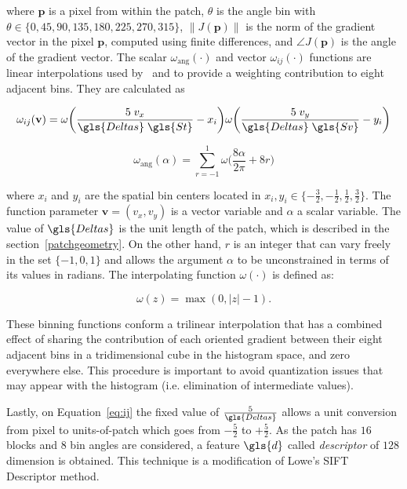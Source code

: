 \noindent  where $\mathbf{p}$ is a pixel from within the patch,  $\theta$ is the angle bin with $ \theta \in \{0, 45, 90, 135, 180, 225, 270, 315\} $,  $ \left\lVert J(\mathbf{p}) \right\rVert $ is the norm of the gradient vector in the pixel $\mathbf{p}$, computed using finite differences, and $\angle J(\mathbf{p}) $ is the angle of the gradient vector.  The scalar $ \omega_\mathrm{ang}(\cdot) $  and vector $ \omega_{ij}(\cdot) $ functions are linear interpolations used by~\cite{Lowe2004} and \cite{Vedaldi2010} to provide a weighting contribution to eight adjacent bins.  They are calculated as  

\begin{equation}
 \omega_{ij}(\mathbf{v}) = \omega \bigg ( \frac{5 \;v_x}{\gls{Deltas} \; \gls{St}} - x_i \bigg ) \omega \bigg ( \frac{5 \; v_y}{\gls{Deltas} \; \gls{Sv}} - y_i \bigg ) 
\label{eq:ij}
\end{equation}

\begin{equation}
 \omega_\mathrm{ang}(\alpha) = \sum_{r=-1}^{1} \omega \bigg ( \frac{8\alpha}{2\pi} + 8r \bigg )
\label{eq:wang}
\end{equation}

\noindent where $x_i$ and $y_i$ are the spatial bin centers located in $ x_i,y_i \in \{-\frac{3}{2},-\frac{1}{2},\frac{1}{2},\frac{3}{2}\} $. The function parameter $\mathbf{v} = ( v_x, v_y ) $ is a vector variable and $\alpha$ a scalar variable.  The value of  $\gls{Deltas}$ is the unit length of the patch, which is described in the section~\ref{patchgeometry}.  On the other hand, $r$ is an integer that can vary freely in the set $\{ -1, 0, 1 \} $ and allows the argument $\alpha$ to be unconstrained in terms of its values in radians. The interpolating function $\omega(\cdot)$ is defined as:

\begin{equation}
\omega(z) = \max(0,|z|-1).
\label{eq:weighting}
\end{equation}

These binning functions conform a trilinear interpolation that has a combined effect of sharing the contribution of each oriented gradient between their eight adjacent bins in a tridimensional cube in the histogram space, and zero everywhere else.  This procedure is important to avoid quantization issues that may appear with the histogram (i.e. elimination of intermediate values).

Lastly, on Equation~\ref{eq:ij} the fixed value of $ \frac{5}{\gls{Deltas}} $ allows a unit conversion from pixel to units-of-patch which goes from $-\frac{5}{2}$ to $+\frac{5}{2}$.  As the patch has  $16$ blocks and  $8$ bin angles are considered, a feature $\gls{d}$ called \textit{descriptor} of $128$ dimension is obtained. This technique is a modification of Lowe's SIFT Descriptor method.

